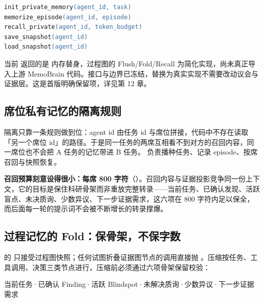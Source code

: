 \begin{lstlisting}[language=ps]
init_private_memory(agent_id, task)
memorize_episode(agent_id, episode)
recall_private(agent_id, token_budget)
save_snapshot(agent_id)
load_snapshot(agent_id)
\end{lstlisting}

\begin{honestbox}
当前  返回的是  内存替身，过程图的 Flush/Fold/Recall 为简化实现，尚未真正导入上游 MemoBrain 代码。接口与边界已冻结，替换为真实实现不需要改动议会与证据层。这是首版明确保留项，详见第 12 章。
\end{honestbox}

\subsection{席位私有记忆的隔离规则}

隔离只靠一条规则做到位：agent id 由任务 id 与席位拼接，代码中不存在读取「另一个席位 id」的路径。于是同一任务的两席互相看不到对方的召回内容，同一席位也不会把 A 任务的记忆带进 B 任务。 负责播种任务、记录 episode、按席召回与快照恢复。

\textbf{召回预算刻意设得很小：每席 800 字符}（）。召回内容与证据投影竞争同一份上下文，它的目标是保住科研骨架而非重放完整转录——当前任务、已确认发现、活跃盲点、未决质询、少数异议、下一步证据需求，这六项在 800 字符内足以保全，而后面每一轮的提示词不会被不断增长的转录撑爆。

\subsection{过程记忆的 Fold：保骨架，不保字数}

 的  只接受过程图快照；任何试图折叠证据图节点的调用直接抛 。压缩按任务、工具调用、决策三类节点进行，压缩前必须通过六项骨架保留校验：

\begin{center}
\begin{tcolorbox}[colback=panel, colframe=linegray, boxrule=0.6pt, arc=2pt, fontupper=\sffamily\small]
当前任务\enspace·\enspace 已确认 Finding\enspace·\enspace 活跃 Blindspot\enspace·\enspace 未解决质询\enspace·\enspace 少数异议\enspace·\enspace 下一步证据需求
\end{tcolorbox}
\end{center}

